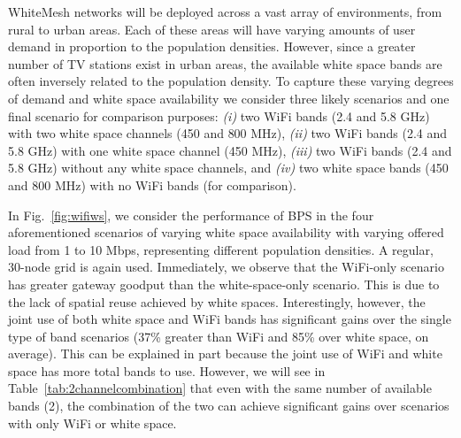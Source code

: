 
WhiteMesh networks will be deployed across a vast array of environments, from
rural to urban areas.  Each of these areas will have varying amounts of user 
demand in proportion to the population densities.  However, since a greater
number of TV stations exist in urban areas, the available white space bands are
often inversely related to the population density. To capture these varying
degrees of demand and white space availability we consider three likely scenarios
and one final scenario for comparison purposes: {\it (i)} two WiFi bands (2.4 and
5.8 GHz) with two white space channels (450 and 800 MHz), {\it (ii)} two WiFi
bands (2.4 and 5.8 GHz) with one white space channel (450 MHz), {\it (iii)} two
WiFi bands (2.4 and 5.8 GHz) without any white space channels, and {\it (iv)}
two white space bands (450 and 800 MHz) with no WiFi bands (for comparison).

In Fig.~\ref{fig:wifiws}, we consider the performance of BPS in the four aforementioned
scenarios of varying white space availability with varying offered load from 1 to 10 Mbps,
representing different population densities. A regular, 30-node grid is again used.
Immediately, we observe that the WiFi-only scenario has greater gateway goodput
than the white-space-only scenario.  This is due to the lack of spatial reuse achieved
by white spaces.  Interestingly, however, the joint use of both white space and WiFi
bands has significant gains over the single type of band scenarios (37\% greater than
WiFi and 85\% over white space, on average).  This can be explained in part
because the joint use of WiFi and white space has more total bands to use.  However,
we will see in Table~\ref{tab:2channelcombination} that even with the same number of
available bands (2), the combination of the two can achieve significant gains over
scenarios with only WiFi or white space.   

